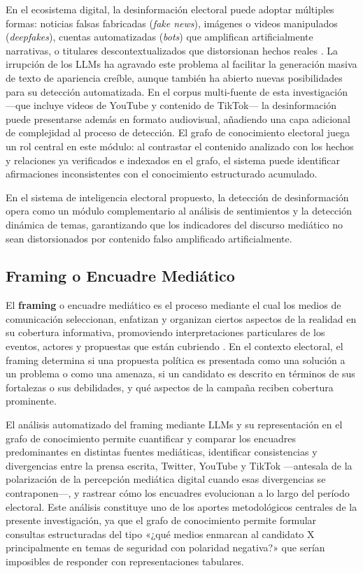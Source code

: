 En el ecosistema digital, la desinformación electoral puede adoptar múltiples formas: noticias falsas fabricadas (\textit{fake news}), imágenes o videos manipulados (\textit{deepfakes}), cuentas automatizadas (\textit{bots}) que amplifican artificialmente narrativas, o titulares descontextualizados que distorsionan hechos reales \parencite{pr_chen2024combating_misinformation}. La irrupción de los LLMs ha agravado este problema al facilitar la generación masiva de texto de apariencia creíble, aunque también ha abierto nuevas posibilidades para su detección automatizada. En el corpus multi-fuente de esta investigación —que incluye videos de YouTube y contenido de TikTok— la desinformación puede presentarse además en formato audiovisual, añadiendo una capa adicional de complejidad al proceso de detección. El grafo de conocimiento electoral juega un rol central en este módulo: al contrastar el contenido analizado con los hechos y relaciones ya verificados e indexados en el grafo, el sistema puede identificar afirmaciones inconsistentes con el conocimiento estructurado acumulado.

En el sistema de inteligencia electoral propuesto, la detección de desinformación opera como un módulo complementario al análisis de sentimientos y la detección dinámica de temas, garantizando que los indicadores del discurso mediático no sean distorsionados por contenido falso amplificado artificialmente.

\subsection{Framing o Encuadre Mediático}

El \textbf{framing} o encuadre mediático es el proceso mediante el cual los medios de comunicación seleccionan, enfatizan y organizan ciertos aspectos de la realidad en su cobertura informativa, promoviendo interpretaciones particulares de los eventos, actores y propuestas que están cubriendo \parencite{bk_entman1993framing}. En el contexto electoral, el framing determina si una propuesta política es presentada como una solución a un problema o como una amenaza, si un candidato es descrito en términos de sus fortalezas o sus debilidades, y qué aspectos de la campaña reciben cobertura prominente.

El análisis automatizado del framing mediante LLMs y su representación en el grafo de conocimiento permite cuantificar y comparar los encuadres predominantes en distintas fuentes mediáticas, identificar consistencias y divergencias entre la prensa escrita, Twitter, YouTube y TikTok —antesala de la polarización de la percepción mediática digital cuando esas divergencias se contraponen—, y rastrear cómo los encuadres evolucionan a lo largo del período electoral. Este análisis constituye uno de los aportes metodológicos centrales de la presente investigación, ya que el grafo de conocimiento permite formular consultas estructuradas del tipo «¿qué medios enmarcan al candidato X principalmente en temas de seguridad con polaridad negativa?» que serían imposibles de responder con representaciones tabulares.

